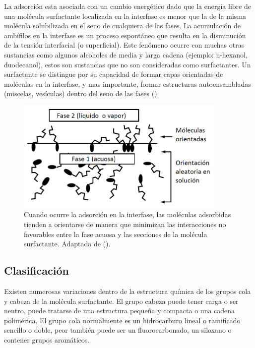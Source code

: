 La adsorción esta asociada con un cambio energético dado que la energía libre de una molécula surfactante localizada en la interfase es menor que la de la misma molécula solubilizada en el seno de cualquiera de las fases. La acumulación de ambífilos en la interfase es un proceso espontáneo que resulta en la disminución de la tensión interfacial (o superficial). Este fenómeno ocurre con muchas otras sustancias como algunos alcoholes de media y larga cadena (ejemplo: n-hexanol, duodecanol), estos son sustancias que no son consideradas como surfactantes. 
Un surfactante se distingue por su capacidad de formar capas orientadas de moléculas en la interfase, y mas importante, formar estructuras autoensambladas (miscelas, vesículas) dentro del seno de las fases (\cite{Cosgrove}).

\begin{figure}
    \centering
    \includegraphics[width=0.9\textwidth]{Graphics/Adsorb.png}
    \caption[Adsorción en la interfase]{Cuando ocurre la adsorción en la interfase, las moléculas adsorbidas tienden a orientarse de manera que minimizan las interacciones no favorables entre la fase acuosa y las secciones de la molécula surfactante. Adaptada de (\cite{Drew}). }
    \label{fig:adsorb}
\end{figure}


\subsection{Clasificación}
Existen numerosas variaciones dentro de la estructura química de los grupos cola y cabeza de la molécula surfactante. El grupo cabeza puede tener carga o ser neutro, puede tratarse de una estructura pequeña y compacta o una cadena polimérica. El grupo cola normalmente es un hidrocarburo lineal o ramificado sencillo o doble, peor también puede ser un fluorocarbonado, un siloxano o contener grupos aromáticos. 

